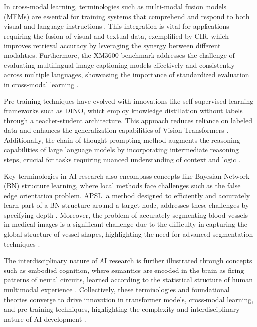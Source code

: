 In cross-modal learning, terminologies such as multi-modal fusion models (MFMs) are essential for training systems that comprehend and respond to both visual and language instructions \cite{zhou2023leveragingtcntransformereffective}. This integration is vital for applications requiring the fusion of visual and textual data, exemplified by CIR, which improves retrieval accuracy by leveraging the synergy between different modalities. Furthermore, the XM3600 benchmark addresses the challenge of evaluating multilingual image captioning models effectively and consistently across multiple languages, showcasing the importance of standardized evaluation in cross-modal learning \cite{thapliyal2022crossmodal3600massivelymultilingualmultimodal}.



Pre-training techniques have evolved with innovations like self-supervised learning frameworks such as DINO, which employ knowledge distillation without labels through a teacher-student architecture. This approach reduces reliance on labeled data and enhances the generalization capabilities of Vision Transformers \cite{liu2022focusformerfocusingneedarchitecture}. Additionally, the chain-of-thought prompting method augments the reasoning capabilities of large language models by incorporating intermediate reasoning steps, crucial for tasks requiring nuanced understanding of context and logic \cite{kojima2022large}.



Key terminologies in AI research also encompass concepts like Bayesian Network (BN) structure learning, where local methods face challenges such as the false edge orientation problem. APSL, a method designed to efficiently and accurately learn part of a BN structure around a target node, addresses these challenges by specifying depth \cite{ling2021bayesiannetworkstructurelearning}. Moreover, the problem of accurately segmenting blood vessels in medical images is a significant challenge due to the difficulty in capturing the global structure of vessel shapes, highlighting the need for advanced segmentation techniques \cite{shin2018deepvesselsegmentationlearning}.



The interdisciplinary nature of AI research is further illustrated through concepts such as embodied cognition, where semantics are encoded in the brain as firing patterns of neural circuits, learned according to the statistical structure of human multimodal experience \cite{raposo2019lowdimensionalembodiedsemanticsmusic}. Collectively, these terminologies and foundational theories converge to drive innovation in transformer models, cross-modal learning, and pre-training techniques, highlighting the complexity and interdisciplinary nature of AI development \cite{korre2023takesvillagemultidisciplinaritycollaboration}.



